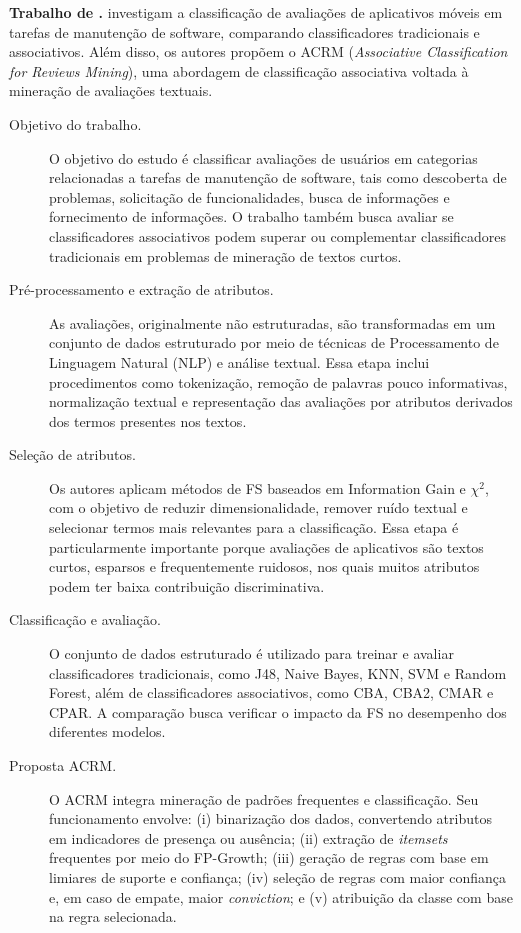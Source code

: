 \textbf{Trabalho de .} 
 investigam a classificação de avaliações de aplicativos móveis em tarefas de manutenção de software, comparando classificadores tradicionais e associativos. Além disso, os autores propõem o ACRM (\textit{Associative Classification for Reviews Mining}), uma abordagem de classificação associativa voltada à mineração de avaliações textuais.

\begin{description}
    \item[Objetivo do trabalho.] O objetivo do estudo é classificar avaliações de usuários em categorias relacionadas a tarefas de manutenção de software, tais como descoberta de problemas, solicitação de funcionalidades, busca de informações e fornecimento de informações. O trabalho também busca avaliar se classificadores associativos podem superar ou complementar classificadores tradicionais em problemas de mineração de textos curtos.

    \item[Pré-processamento e extração de atributos.] As avaliações, originalmente não estruturadas, são transformadas em um conjunto de dados estruturado por meio de técnicas de Processamento de Linguagem Natural (NLP) e análise textual. Essa etapa inclui procedimentos como tokenização, remoção de palavras pouco informativas, normalização textual e representação das avaliações por atributos derivados dos termos presentes nos textos.

    \item[Seleção de atributos.] Os autores aplicam métodos de FS baseados em Information Gain e $\chi^2$, com o objetivo de reduzir dimensionalidade, remover ruído textual e selecionar termos mais relevantes para a classificação. Essa etapa é particularmente importante porque avaliações de aplicativos são textos curtos, esparsos e frequentemente ruidosos, nos quais muitos atributos podem ter baixa contribuição discriminativa.

    \item[Classificação e avaliação.] O conjunto de dados estruturado é utilizado para treinar e avaliar classificadores tradicionais, como J48, Naive Bayes, KNN, SVM e Random Forest, além de classificadores associativos, como CBA, CBA2, CMAR e CPAR. A comparação busca verificar o impacto da FS no desempenho dos diferentes modelos.

    \item[Proposta ACRM.] O ACRM integra mineração de padrões frequentes e classificação. Seu funcionamento envolve: (i) binarização dos dados, convertendo atributos em indicadores de presença ou ausência; (ii) extração de \textit{itemsets} frequentes por meio do FP-Growth; (iii) geração de regras com base em limiares de suporte e confiança; (iv) seleção de regras com maior confiança e, em caso de empate, maior \textit{conviction}; e (v) atribuição da classe com base na regra selecionada.


\end{description}
